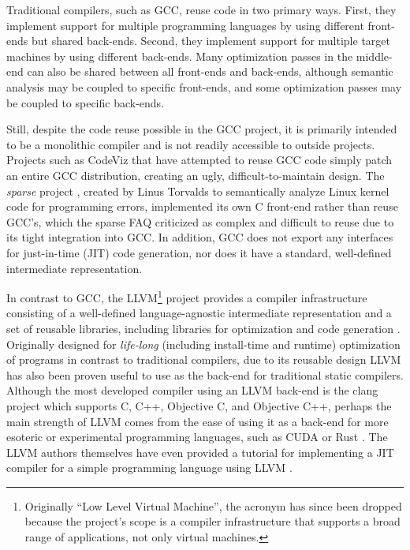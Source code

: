 \documentclass[11pt]{article}
\begin{document}
Traditional compilers, such as GCC, reuse code in two primary ways.  First, they
implement support for multiple programming languages by using different
front-ends but shared back-ends.  Second, they implement support for multiple
target machines by using different back-ends.  Many optimization passes in the
middle-end can also be shared between all front-ends and back-ends, although
semantic analysis may be coupled to specific front-ends, and some optimization passes may
be coupled to specific back-ends.

Still, despite the code reuse possible in the GCC project, it is primarily
intended to be a monolithic compiler and is not readily accessible to outside
projects.  Projects such as CodeViz \cite{codeviz} that have attempted to reuse
GCC code simply patch an entire GCC distribution, creating an ugly,
difficult-to-maintain design.  The {\em sparse} project \cite{sparse}, created
by Linus Torvalds to semantically analyze Linux kernel code for programming
errors, implemented its own C front-end rather than reuse GCC's, which the
sparse FAQ criticized as complex and difficult to reuse due to its tight
integration into GCC.  In addition, GCC does not export any interfaces for
just-in-time (JIT) code generation, nor does it have a standard, well-defined
intermediate representation.

In contrast to GCC, the LLVM\footnote{Originally ``Low Level Virtual Machine'',
the acronym has since been dropped because the project's scope is a compiler
infrastructure that supports a broad range of applications, not only virtual
machines.} project provides a compiler infrastructure consisting of a
well-defined language-agnostic intermediate representation and a set of reusable
libraries, including libraries for optimization and code generation
\cite{lattner2004llvm}.  Originally designed for {\em life-long}
(including install-time and runtime) optimization of programs in contrast to
traditional compilers, due to its reusable design LLVM has also been proven
useful to use as the back-end for traditional static compilers.  Although the
most developed compiler using an LLVM back-end is the clang project which
supports C, C++, Objective C, and Objective C++, perhaps the main strength of
LLVM comes from the ease of using it as a back-end for more esoteric or
experimental programming languages, such as CUDA \cite{nvidia_llvm} or Rust
\cite{rust}.  The LLVM authors themselves have even provided a tutorial for
implementing a JIT compiler for a simple programming language using LLVM
\cite{kaleidoscope}.
\end{document}
